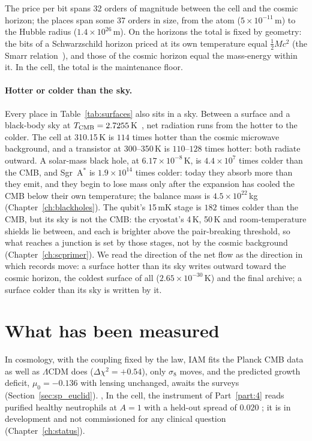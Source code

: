 The price per bit spans 32 orders of magnitude between the cell and the cosmic horizon; the places span some 37 orders in size, from the
atom ($5\times10^{-11}$\,m) to the Hubble radius ($1.4\times10^{26}$\,m). On the horizons the total is fixed by geometry: the bits of a
Schwarzschild horizon priced at its own temperature equal $\tfrac12Mc^2$ (the Smarr relation~\cite{Smarr1973}), and those of the cosmic horizon equal the mass-energy
within it. In the cell, the total is the maintenance floor.

\paragraph{Hotter or colder than the sky.} Every place in Table~\ref{tab:surfaces} also sits in a sky. Between a surface and a black-body sky at
$T_{\rm CMB}=2.7255$\,K~\cite{Fixsen2009}, net radiation runs from the hotter to the colder. \derived{} The cell at 310.15\,K is $114$ times hotter
than the cosmic microwave background, and a transistor at 300--350\,K is $110$--$128$ times hotter: both radiate outward. A solar-mass black hole,
at $6.17\times10^{-8}$\,K, is $4.4\times10^{7}$ times colder than the CMB, and Sgr~A$^*$ is $1.9\times10^{14}$ times colder: today they absorb more
than they emit, and they begin to lose mass only after the expansion has cooled the CMB below their own temperature; the balance mass is
$4.5\times10^{22}$\,kg (Chapter~\ref{ch:blackholes}). \calc{} The qubit's 15\,mK stage is $182$ times colder than the CMB, but its sky is not the
CMB: the cryostat's 4\,K, 50\,K and room-temperature shields lie between, and each is brighter above the pair-breaking threshold, so what reaches a
junction is set by those stages, not by the cosmic background (Chapter~\ref{ch:scprimer}). \calc{} We read the direction of the net flow as the
direction in which records move: a surface hotter than its sky writes outward toward the cosmic horizon, the coldest surface of all
($2.65\times10^{-30}$\,K) and the final archive; a surface colder than its sky is written by it. \interp


\section{What has been measured}
In cosmology, with the coupling fixed by the law, IAM fits the Planck CMB data as well as $\Lambda$CDM does ($\Delta\chi^2=+0.54$), only $\sigma_8$ moves, and the
predicted growth deficit, $\mu_0=-0.136$ with lensing unchanged, awaits the surveys (Section~\ref{sec:sp_euclid}). \measured, \prediction{} In the cell, the instrument of Part~\ref{part:4} reads purified healthy
neutrophils at $A=1$ with a held-out spread of $0.020$ \calibrated; it is in development and not commissioned for any clinical question
(Chapter~\ref{ch:status}).

